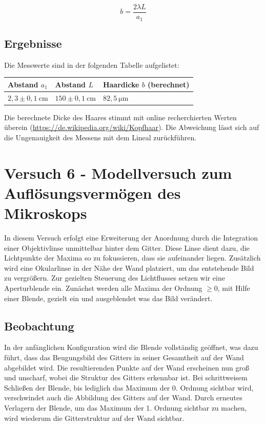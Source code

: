         \begin{equation}
            b = \frac{2 \lambda L}{a_{1}}
        \end{equation}
    
    \subsection{Ergebnisse}

        Die Messwerte sind in der folgenden Tabelle aufgelistet:

        \begin{table}[H]
            \centering
            \begin{tabular}{|l|l|l|}
                \hline
                Abstand $a_{1}$ & Abstand $L$ & Haardicke $b$ (berechnet)\\
                \hline
                $2,3 \pm 0,1\ \mathrm{cm}$ & $150 \pm 0,1\ \mathrm{cm}$ & $82,5\ \mathrm{\mu m}$\\
                \hline
            \end{tabular}
        \end{table}

        Die berechnete Dicke des Haares stimmt mit online recherchierten Werten überein (\url{https://de.wikipedia.org/wiki/Kopfhaar}). Die Abweichung lässt sich auf die Ungenauigkeit des Messens mit dem Lineal zurückführen.

\section{Versuch 6 - Modellversuch zum Auflösungsvermögen des Mikroskops}

    In diesem Versuch erfolgt eine Erweiterung der Anordnung durch die Integration einer Objektivlinse unmittelbar hinter dem Gitter. Diese Linse dient dazu, die Lichtpunkte der Maxima so zu fokussieren, dass sie aufeinander liegen. Zusätzlich wird eine Okularlinse in der Nähe der Wand platziert, um das entstehende Bild zu vergrößern. Zur gezielten Steuerung des Lichtflusses setzen wir eine Aperturblende ein. Zunächst werden alle Maxima der Ordnung $\geq 0$, mit Hilfe einer Blende, gezielt ein und ausgeblendet was das Bild verändert.


    \subsection{Beobachtung}

        In der anfänglichen Konfiguration wird die Blende vollständig geöffnet, was dazu führt, dass das Beugungsbild des Gitters in seiner Gesamtheit auf der Wand abgebildet wird. Die resultierenden Punkte auf der Wand erscheinen nun groß und unscharf, wobei die Struktur des Gitters erkennbar ist. Bei schrittweisem Schließen der Blende, bis lediglich das Maximum der 0. Ordnung sichtbar wird, verschwindet auch die Abbildung des Gitters auf der Wand. Durch erneutes Verlagern der Blende, um das Maximum der 1. Ordnung sichtbar zu machen, wird wiederum die Gitterstruktur auf der Wand sichtbar.

